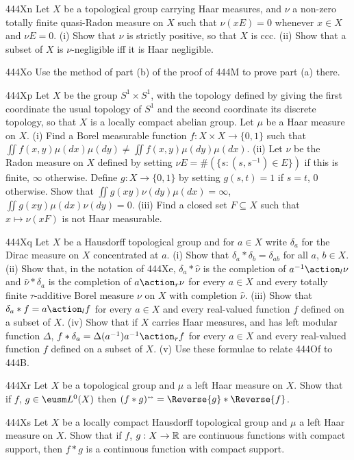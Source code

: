 {\spheader 444Xn Let $X$ be a topological group carrying Haar measures,
and $\nu$ a non-zero totally finite quasi-Radon measure on $X$ such that
$\nu(xE)=0$
whenever $x\in X$ and $\nu E=0$.   (i) Show that $\nu$ is strictly
positive, so that $X$ is ccc.
(ii) Show that a subset of $X$ is $\nu$-negligible iff it is Haar
negligible.

\spheader 444Xo Use the method of part (b) of the proof of 444M to prove
part (a) there.

\sqheader 444Xp Let $X$ be the group $S^1\times S^1$, with the topology
defined by giving the first coordinate the usual topology of $S^1$ and
the second coordinate its discrete topology, so that $X$ is a locally
compact abelian group.   Let $\mu$ be a Haar measure on $X$.   (i) Find
a Borel measurable function $f:X\times X\to\{0,1\}$ such that
$\iint f(x,y)\mu(dx)\mu(dy)\ne\iint f(x,y)\mu(dy)\mu(dx)$.   (ii) Let
$\nu$ be the Radon measure on $X$ defined by setting
$\nu E=\#(\{s:(s,s^{-1})\in E\})$ if this is finite, $\infty$ otherwise.
Define $g:X\to\{0,1\}$ by setting $g(s,t)=1$ if $s=t$, $0$ otherwise.
Show that $\iint g(xy)\nu(dy)\mu(dx)=\infty$,
$\iint g(xy)\mu(dx)\nu(dy)=0$.   (iii) Find a closed set $F\subseteq X$
such that $x\mapsto\nu(xF)$ is not Haar measurable.

\sqheader 444Xq Let $X$ be a Hausdorff topological group and for
$a\in X$ write $\delta_a$ for the Dirac measure on $X$ concentrated at $a$.
(i) Show that $\delta_a*\delta_b=\delta_{ab}$ for all
$a$, $b\in X$.   (ii) Show that, in the notation of 444Xe,
$\delta_a*\hat\nu$ is the completion of $a^{-1}\action_l\nu$ and
$\hat\nu*\delta_a$ is the completion of $a\action_r\nu$ for every
$a\in X$ and every totally finite $\tau$-additive Borel measure $\nu$ on
$X$ with completion $\hat\nu$.   (iii) Show that
$\delta_a*f=a\action_lf$ for every $a\in X$ and every real-valued
function $f$ defined on a subset of $X$.   (iv) Show that if $X$ carries
Haar measures, and has left modular function $\Delta$,
$f*\delta_a=\Delta(a^{-1})a^{-1}\action_rf$ for every $a\in X$ and
every real-valued function $f$ defined on a subset of $X$.   (v) Use
these formulae to relate 444Of to 444B.

\spheader 444Xr Let $X$ be a topological group and $\mu$ a left Haar
measure on $X$.   Show that if $f$, $g\in\eusm L^0(X)$ then
$(f*g)\ssplrarrow=\Reverse{g}*\Reverse{f}$.

\spheader 444Xs Let $X$ be a locally compact Hausdorff topological group
and $\mu$ a left Haar measure on $X$.   Show that if $f$, $g:X\to\Bbb R$
are continuous functions with compact support, then $f*g$ is a
continuous function with compact support.

}
